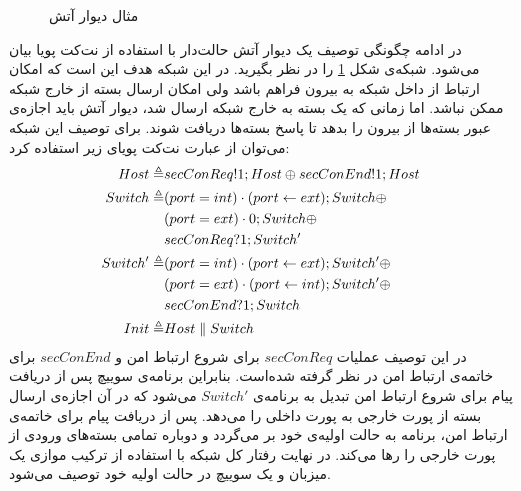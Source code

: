 \begin{figure}
    \centering
    \caption{مثال دیوار آتش}
    \label{fig:dynetkat:firewall}
\end{figure}
در ادامه چگونگی توصیف یک دیوار آتش%
حالت‌دار%
با استفاده از نت‌کت پویا بیان می‌شود.
شبکه‌ی شکل
\ref{fig:dynetkat:firewall}
را در نظر بگیرید.
در این شبکه هدف این است که امکان ارتباط از داخل شبکه به بیرون فراهم باشد ولی امکان ارسال بسته از خارج شبکه ممکن نباشد.
اما زمانی که یک بسته به خارج شبکه ارسال شد، دیوار آتش باید اجازه‌ی عبور بسته‌ها از بیرون را بدهد تا پاسخ بسته‌ها دریافت شوند.
برای توصیف این شبکه می‌توان از عبارت نت‌کت پویای زیر استفاده کرد:
\begin{align*}
    Host  \triangleq   & secConReq!1;Host \oplus secConEnd!1;Host        \\
    Switch \triangleq  & (port = int) \cdot (port \leftarrow ext);Switch \oplus \\
                       & (port = ext)\cdot 0 ; Switch \oplus             \\
                       & secConReq?1;Switch'                             \\
    Switch' \triangleq & (port =int) \cdot (port \leftarrow ext);Switch' \oplus \\
                       & (port=ext)\cdot(port\leftarrow int);Switch' \oplus     \\
                       & secConEnd?1;Switch                              \\
    Init \triangleq    & Host \parallel Switch
\end{align*}
در این توصیف عملیات 
$secConReq$
برای شروع ارتباط امن و
$secConEnd$
برای خاتمه‌ی ارتباط امن در نظر گرفته شده‌است.
بنابراین برنامه‌ی سوییچ پس از دریافت پیام برای شروع ارتباط امن تبدیل به برنامه‌ی 
$Switch'$
می‌شود که در آن اجازه‌ی ارسال بسته از پورت خارجی به پورت داخلی را می‌دهد.
پس از دریافت پیام برای خاتمه‌ی ارتباط امن، برنامه به حالت اولیه‌ی خود بر می‌گردد و دوباره تمامی بسته‌های ورودی از پورت خارجی را رها می‌کند.
در نهایت رفتار کل شبکه با استفاده از ترکیب موازی یک میزبان و یک سوییچ در حالت اولیه خود توصیف می‌شود.
